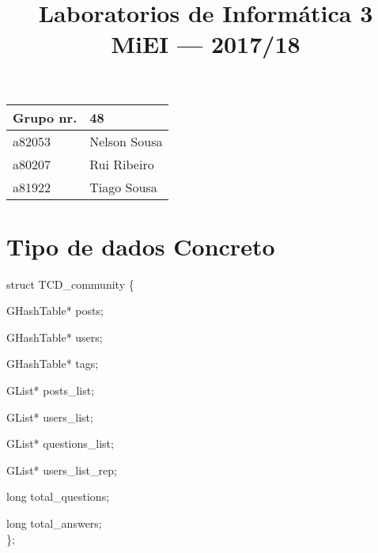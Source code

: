 \documentclass[a4paper,10pt]{article}
\title{
            Laboratorios de Inform\'{a}tica 3
\\
        MiEI --- 2017/18
}
\date\mydate
\begin{document}
\maketitle

\begin{center}\large
\begin{tabular}{ll}
\textbf{Grupo} nr. & 48
\\\hline
a82053 & Nelson Sousa 
\\
a80207 & Rui Ribeiro  
\\
a81922 & Tiago Sousa  
\end{tabular}
\end{center}

\section{Tipo de dados Concreto}


struct TCD\_community \{
  
  \quad GHashTable* posts; 
  
  \quad GHashTable* users;
  
  \quad GHashTable* tags;
  
  \quad GList* posts\_list;

  \quad GList* users\_list;
  
  \quad GList* questions\_list;
  
  \quad GList* users\_list\_rep;
  
  \quad long total\_questions;
  
  \quad long total\_answers;
  \\
\};
  
\end{document}
